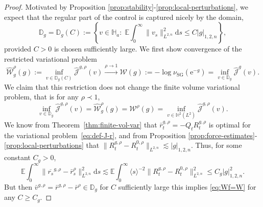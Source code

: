 \documentclass[11pt, a4paper]{scrartcl}
\numberwithin{equation}{section}
\theoremstyle{plain}
\theoremstyle{remark}
\newcommand{\assign}{:=}
\newcommand{\mathd}{\mathrm{d}}
\newcommand{\mathe}{\mathrm{e}}
\newcommand{\tmop}[1]{\ensuremath{\operatorname{#1}}}
\newcommand{\tmtextit}[1]{\text{{\itshape{#1}}}}
\begin{document}
\begin{proof}
	\tmtextit{Restriction to $\mathbb{D}_g$:} Motivated by Proposition
	\ref{prop:stability}-\ref{prop:local-perturbations}, we expect that the
	regular part of the control is captured nicely by the domain,
	\begin{equation}
		\mathbb{D}_g =\mathbb{D}_g (C) \assign \left\{ v \in \mathbb{H}_a : \;
		\mathbb{E} \int_0^{\infty} \| v_s \|^2_{L^{2, n}} \mathd s \leqslant C | g
		|_{1, 2, n} \right\}, \label{eq:Df-r}
	\end{equation}
	provided $C > 0$ is chosen sufficiently large. We first show convergence of
	the restricted variational problem
	\[ \widehat{\mathcal{W}}_g^{\rho} (g) \assign \inf_{v \in \mathbb{D}_g (C)}
		\hat{\mathcal{J}}^{g, \rho} (v) \overset{\rho \rightarrow
			1}{\longrightarrow} \mathcal{W} (g) \assign - \log \nu_{\tmop{SG}}
		(\mathe^{- g}) = \inf_{v \in \mathbb{D}_g}  \hat{\mathcal{J}}^g (v) . \]
	We claim that this restriction does not change the finite volume variational
	problem, that is for any $\rho \prec 1$,
	\begin{equation}
		\inf_{v \in \mathbb{D}_g}  \hat{\mathcal{J}}^{g, \rho} (v) =
		\widehat{\mathcal{W}}_g^{\rho} (g) = \mathcal{W}^{\rho} (g) = \inf_{v \in
			\mathbb{H}^2 (L^2)}  \hat{\mathcal{J}}^{g, \rho} (v) . \label{eq:Wf=W}
	\end{equation}
	We know from Theorem~\ref{thm:finite-vol-var} that $\bar{r}^{g, \rho}_t =
		- Q_t R_t^{g, \rho}$ is optimal for the variational
	problem~\eqref{eq:def-J-r}, and from Proposition
	\ref{prop:force-estimates}-\ref{prop:local-perturbations} that $\| R_t^{g,
				\rho} - R_t^{0, \rho} \|_{L^{2, n}} \lesssim | g |_{1, 2, n}$. Thus, for
	some constant $C_g > 0$,
	\[ \mathbb{E} \int_0^{\infty} \| \overline{r_s}^{g, \rho} - \bar{r}_s^{\rho}
		\|_{L^{2, n}}^2 \mathd s \lesssim \mathbb{E} \int_0^{\infty} \langle s
		\rangle^{- 2} \| R_t^{g, \rho} - R_t^{0, \rho} \|^2_{L^{2, n}} \leqslant
		C_g | g |_{1, 2, n}^2 . \]
	But then $\bar{v}^{g, \rho} = \bar{r}^{g, \rho} - \bar{r}^{\rho} \in
		\mathbb{D}_g$ for $C$ sufficiently large this implies \eqref{eq:Wf=W} for
	any $C \geqslant C_g$.


\end{proof}
\end{document}
